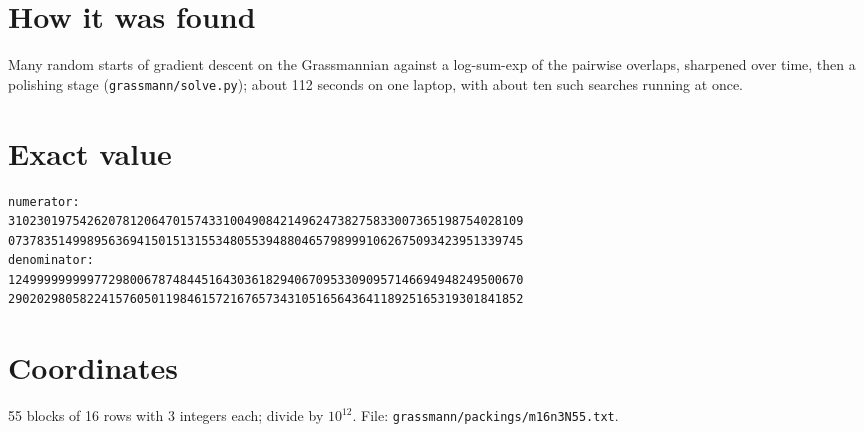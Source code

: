\documentclass[11pt,a4paper]{article}
\begin{document}
\section{How it was found}
Many random starts of gradient descent on the Grassmannian against a log-sum-exp of the pairwise overlaps, sharpened over time, then a polishing stage (\texttt{grassmann/solve.py}); about 112 seconds on one laptop, with about ten such searches running at once.


\appendix
\section{Exact value}
{\small
\begin{verbatim}
numerator:
310230197542620781206470157433100490842149624738275833007365198754028109
073783514998956369415015131553480553948804657989991062675093423951339745
denominator:
124999999999772980067874844516430361829406709533090957146694948249500670
290202980582241576050119846157216765734310516564364118925165319301841852
\end{verbatim}}

\section{Coordinates}
55 blocks of 16 rows with 3 integers each; divide by $10^{12}$. File: \texttt{grassmann/packings/m16n3N55.txt}.
{\tiny
\begin{multicols}{3}
\end{multicols}}
\end{document}
